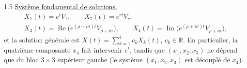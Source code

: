 \documentclass[12pt]{article}
\begin{document}
\begin{spacing}{1.5}
\underline{Système fondamental de solutions.}
\begin{gather*}
X_1(t)=e^{t}V_1,\qquad X_2(t)=e^{rt}V_r,\\
X_3(t)=\operatorname{Re}\big(e^{(\rho+i\sigma)t}V_{\rho+i\sigma}\big),\qquad X_4(t)=\operatorname{Im}\big(e^{(\rho+i\sigma)t}V_{\rho+i\sigma}\big),
\end{gather*}
et la solution générale est $X(t)=\sum_{k=1}^4 c_kX_k(t)$, $c_k\in\mathbb{R}$. En particulier, la quatrième composante $x_4$ fait intervenir $e^t$, tandis que $(x_1,x_2,x_3)$ ne dépend que du bloc $3\times3$ supérieur gauche (le système $(x_1,x_2,x_3)$ est découplé de $x_4$).


\end{spacing}
\end{document}
